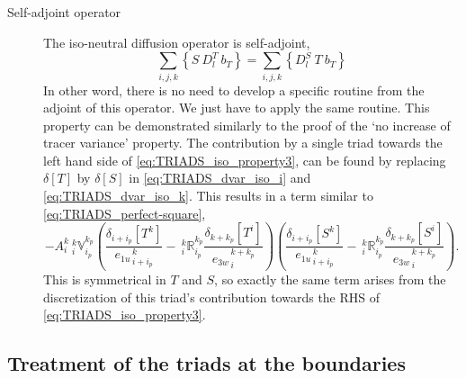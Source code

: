 \documentclass[../main/NEMO_manual]{subfiles}
\begin{document}
\begin{description}
\item [Self-adjoint operator] The iso-neutral diffusion operator is self-adjoint, \ie
  \begin{equation}
    \label{eq:TRIADS_iso_property3}
    \sum_{i,j,k} \left\{ S \ D_l^T \ b_T \right\} = \sum_{i,j,k} \left\{ D_l^S \ T \ b_T \right\}
  \end{equation}
  In other word, there is no need to develop a specific routine from the adjoint of this operator.
  We just have to apply the same routine.
  This property can be demonstrated similarly to the proof of the `no increase of tracer variance' property.
  The contribution by a single triad towards the left hand side of \autoref{eq:TRIADS_iso_property3},
  can be found by replacing $\delta[T]$ by $\delta[S]$ in \autoref{eq:TRIADS_dvar_iso_i} and \autoref{eq:TRIADS_dvar_iso_k}.
  This results in a term similar to \autoref{eq:TRIADS_perfect-square},
  \[
    - {A}_i^k{\:} _i^k\mathbb{V}_{i_p}^{k_p}
    \left(
      \frac{ \delta_{i+ i_p}[T^k] }{ {e_{1u}}_{\,i + i_p}^{\,k} }
      -{\:}_i^k\mathbb{R}_{i_p}^{k_p}
      \frac{ \delta_{k+k_p} [T^i] }{{e_{3w}}_{\,i}^{\,k+k_p} }
    \right)
    \left(
      \frac{ \delta_{i+ i_p}[S^k] }{ {e_{1u}}_{\,i + i_p}^{\,k} }
      -{\:}_i^k\mathbb{R}_{i_p}^{k_p}
      \frac{ \delta_{k+k_p} [S^i] }{{e_{3w}}_{\,i}^{\,k+k_p} }
    \right).
  \]
This is symmetrical in $T $ and $S$, so exactly the same term arises from
the discretization of this triad's contribution towards the RHS of \autoref{eq:TRIADS_iso_property3}.
\end{description}

\subsection{Treatment of the triads at the boundaries}
\label{sec:TRIADS_iso_bdry}
\end{document}
